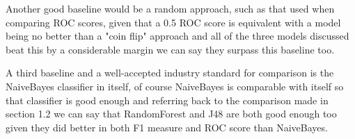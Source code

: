 Another good baseline would be a random approach, such as that used when comparing ROC scores, given that a 0.5 ROC score is equivalent with a model being no better than a "coin flip" approach and all of the three models discussed beat this by a considerable margin we can say they surpass this baseline too. 

A third baseline and a well-accepted industry standard for comparison is the NaiveBayes classifier in itself, of course NaiveBayes is comparable with itself so that classifier is good enough and referring back to the comparison made in section 1.2 we can say that RandomForest and J48 are both good enough too given they did better in both F1 measure and ROC score than NaiveBayes.

